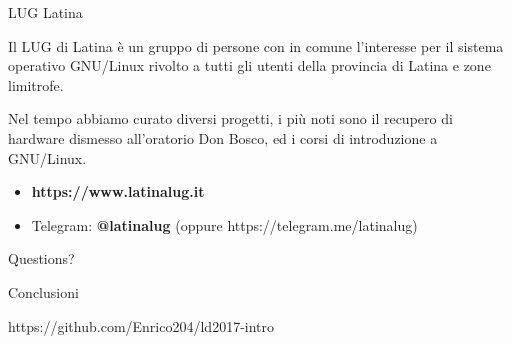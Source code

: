 \documentclass[10pt]{beamer}
\begin{document}
\begin{frame}[fragile]{LUG Latina}

Il LUG di Latina è un gruppo di persone con in comune l'interesse per il sistema operativo GNU/Linux rivolto a tutti gli utenti della provincia di Latina e zone limitrofe.

Nel tempo abbiamo curato diversi progetti, i più noti sono il recupero di hardware dismesso all'oratorio Don Bosco, ed i corsi di introduzione a GNU/Linux.

\begin{itemize}
\item \textbf{https://www.latinalug.it}
\item Telegram: \textbf{@latinalug} (oppure https://telegram.me/latinalug)
\end{itemize}

\end{frame}

\begin{frame}[standout]
  Questions?
\end{frame}

\begin{frame}{Conclusioni}

  \begin{center}\ccbysa\end{center}
  
  \center https://github.com/Enrico204/ld2017-intro

\end{frame}
\end{document}
